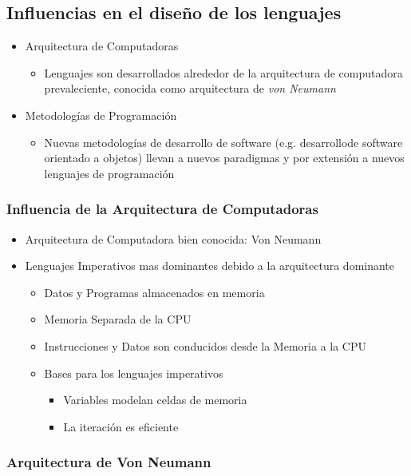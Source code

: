 \documentclass[11pt]{article}
\begin{document}
\subsection*{Influencias en el diseño de los lenguajes}
\label{sec:orgheadline14}
\begin{itemize}
\item Arquitectura de Computadoras
\begin{itemize}
\item Lenguajes son desarrollados alrededor de la arquitectura de
computadora prevaleciente, conocida como arquitectura de \emph{von Neumann}
\end{itemize}
\item Metodologías de Programación
\begin{itemize}
\item Nuevas metodologías de desarrollo de software (e.g. desarrollode
software orientado a objetos) llevan a nuevos paradigmas y por
extensión a nuevos lenguajes de programación
\end{itemize}
\end{itemize}

\subsubsection*{Influencia de la Arquitectura de Computadoras}
\label{sec:orgheadline9}

\begin{itemize}
\item Arquitectura de Computadora bien conocida: Von Neumann
\item Lenguajes Imperativos mas dominantes debido a la arquitectura
dominante
\begin{itemize}
\item Datos y Programas almacenados en memoria
\item Memoria Separada de la CPU
\item Instrucciones y Datos son conducidos desde la Memoria a la CPU
\item Bases para los lenguajes imperativos
\begin{itemize}
\item Variables modelan celdas de memoria
\item La iteración es eficiente
\end{itemize}
\end{itemize}
\end{itemize}

\subsubsection*{Arquitectura de Von Neumann}
\label{sec:orgheadline10}
\end{document}
